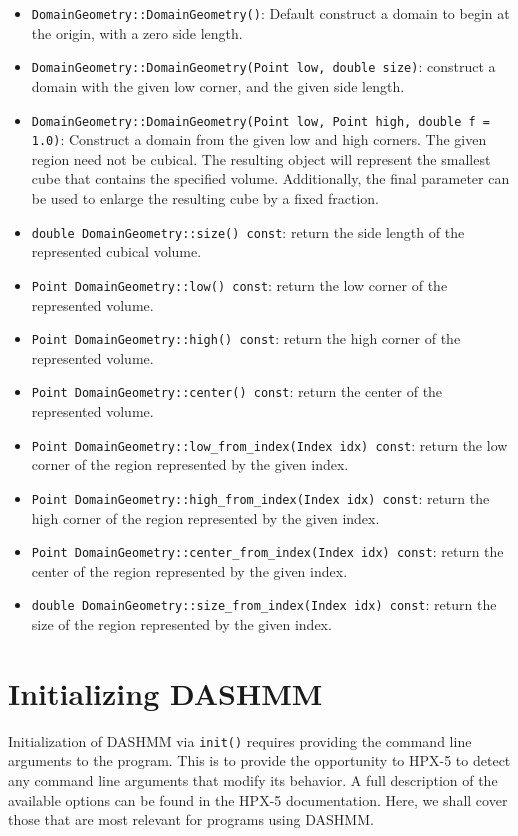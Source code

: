 \begin{itemize}
  \item \texttt{DomainGeometry::DomainGeometry()}: Default construct a domain
    to begin at the origin, with a zero side length.
  \item \texttt{DomainGeometry::DomainGeometry(Point low, double size)}:
    construct a domain with the given low corner, and the given side length.
  \item \texttt{DomainGeometry::DomainGeometry(Point low, Point high,
    double f = 1.0)}: Construct a domain from the given low and high corners.
    The given region need not be cubical. The resulting object will represent
    the smallest cube that contains the specified volume. Additionally, the
    final parameter can be used to enlarge the resulting cube by a fixed
    fraction.
  \item \texttt{double DomainGeometry::size() const}: return the side length
    of the represented cubical volume.
  \item \texttt{Point DomainGeometry::low() const}: return the low corner of
    the represented volume.
  \item \texttt{Point DomainGeometry::high() const}: return the high corner of
    the represented volume.
  \item \texttt{Point DomainGeometry::center() const}: return the center of the
    represented volume.
  \item \texttt{Point DomainGeometry::low\_from\_index(Index idx) const}: return
    the low corner of the region represented by the given index.
  \item \texttt{Point DomainGeometry::high\_from\_index(Index idx) const}: return
    the high corner of the region represented by the given index.
  \item \texttt{Point DomainGeometry::center\_from\_index(Index idx) const}: return
    the center of the region represented by the given index.
  \item \texttt{double DomainGeometry::size\_from\_index(Index idx) const}: return
    the size of the region represented by the given index.
\end{itemize}



\section{Initializing DASHMM}

Initialization of DASHMM via \texttt{init()} requires providing the command
line arguments to the program. This is to provide the opportunity to HPX-5 to
detect any command line arguments that modify its behavior. A full description
of the available options can be found in the HPX-5 documentation. Here, we
shall cover those that are most relevant for programs using DASHMM.

